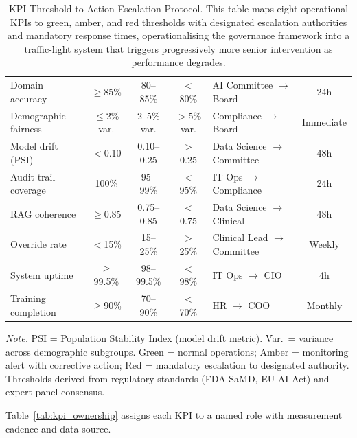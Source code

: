 \begin{table}[!htbp]
\tablestripes\tablefontsize
\tablefontsize
\caption[KPI Threshold-to-Action Escalation Protocol]{KPI Threshold-to-Action Escalation Protocol. This table maps eight operational KPIs to green, amber, and red thresholds with designated escalation authorities and mandatory response times, operationalising the governance framework into a traffic-light system that triggers progressively more senior intervention as performance degrades.}
\begin{tabularx}{\textwidth}{@{} p{2.5cm} c c c L c @{}}
\toprule
{} &  &  &  &  &  \\
\midrule
Domain accuracy & $\geq$85\% & 80--85\% & $<$80\% & AI Committee $\to$ Board & 24h \\
\addlinespace
Demographic fairness & $\leq$2\% var. & 2--5\% var. & $>$5\% var. & Compliance $\to$ Board & Immediate \\
\addlinespace
Model drift (PSI) & $<$0.10 & 0.10--0.25 & $>$0.25 & Data Science $\to$ Committee & 48h \\
\addlinespace
Audit trail coverage & 100\% & 95--99\% & $<$95\% & IT Ops $\to$ Compliance & 24h \\
\addlinespace
RAG coherence & $\geq$0.85 & 0.75--0.85 & $<$0.75 & Data Science $\to$ Clinical & 48h \\
\addlinespace
Override rate & $<$15\% & 15--25\% & $>$25\% & Clinical Lead $\to$ Committee & Weekly \\
\addlinespace
System uptime & $\geq$99.5\% & 98--99.5\% & $<$98\% & IT Ops $\to$ CIO & 4h \\
\addlinespace
Training completion & $\geq$90\% & 70--90\% & $<$70\% & HR $\to$ COO & Monthly \\
\bottomrule
\end{tabularx}
\vspace{0.5em}\noindent\textit{Note.} PSI = Population Stability Index (model drift metric). Var.\ = variance across demographic subgroups. Green = normal operations; Amber = monitoring alert with corrective action; Red = mandatory escalation to designated authority. Thresholds derived from regulatory standards (FDA SaMD, EU AI Act) and expert panel consensus.
\end{table}

Table~\ref{tab:kpi_ownership} assigns each KPI to a named role with measurement cadence and data source.

